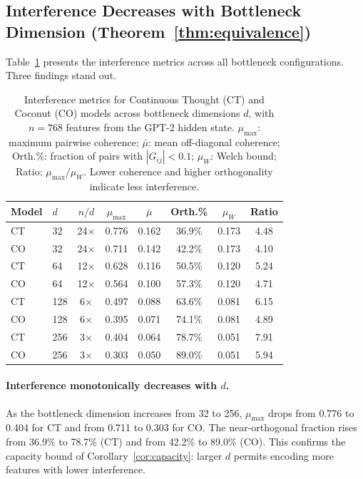 \subsection{Interference Decreases with Bottleneck Dimension (Theorem~\ref{thm:equivalence})}

Table~\ref{tab:interference_metrics} presents the interference metrics across all bottleneck configurations. Three findings stand out.

\begin{table}[t]
\centering
\caption{Interference metrics for Continuous Thought (CT) and Coconut (CO) models across bottleneck dimensions $d$, with $n = 768$ features from the GPT-2 hidden state. $\mu_{\max}$: maximum pairwise coherence; $\bar{\mu}$: mean off-diagonal coherence; Orth.\%: fraction of pairs with $|G_{ij}| < 0.1$; $\mu_W$: Welch bound; Ratio: $\mu_{\max}/\mu_W$. Lower coherence and higher orthogonality indicate less interference.}
\label{tab:interference_metrics}
\small
\begin{tabular}{llcccccc}
\toprule
\textbf{Model} & $d$ & $n/d$ & $\mu_{\max}$ & $\bar{\mu}$ & \textbf{Orth.\%} & $\mu_W$ & \textbf{Ratio} \\
\midrule
CT & 32 & 24$\times$ & 0.776 & 0.162 & 36.9\% & 0.173 & 4.48 \\
CO & 32 & 24$\times$ & 0.711 & 0.142 & 42.2\% & 0.173 & 4.10 \\
\midrule
CT & 64 & 12$\times$ & 0.628 & 0.116 & 50.5\% & 0.120 & 5.24 \\
CO & 64 & 12$\times$ & 0.564 & 0.100 & 57.3\% & 0.120 & 4.71 \\
\midrule
CT & 128 & 6$\times$ & 0.497 & 0.088 & 63.6\% & 0.081 & 6.15 \\
CO & 128 & 6$\times$ & 0.395 & 0.071 & 74.1\% & 0.081 & 4.89 \\
\midrule
CT & 256 & 3$\times$ & 0.404 & 0.064 & 78.7\% & 0.051 & 7.91 \\
CO & 256 & 3$\times$ & 0.303 & 0.050 & 89.0\% & 0.051 & 5.94 \\
\bottomrule
\end{tabular}
\end{table}

\paragraph{Interference monotonically decreases with $d$.} As the bottleneck dimension increases from 32 to 256, $\mu_{\max}$ drops from 0.776 to 0.404 for CT and from 0.711 to 0.303 for CO. The near-orthogonal fraction rises from 36.9\% to 78.7\% (CT) and from 42.2\% to 89.0\% (CO). This confirms the capacity bound of Corollary~\ref{cor:capacity}: larger $d$ permits encoding more features with lower interference.

